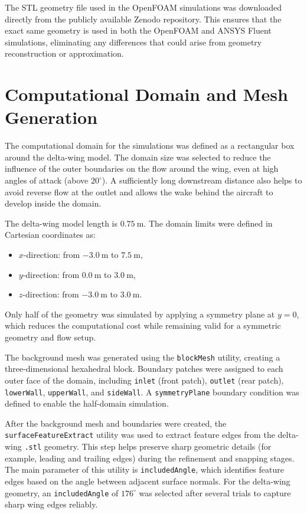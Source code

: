 The STL geometry file used in the OpenFOAM simulations was downloaded directly from the publicly available Zenodo repository. This ensures that the exact same geometry is used in both the OpenFOAM and ANSYS Fluent simulations, eliminating any differences that could arise from geometry reconstruction or approximation.

\section{Computational Domain and Mesh Generation}
The computational domain for the simulations was defined as a rectangular box around the delta-wing model. The domain size was selected to reduce the influence of the outer boundaries on the flow around the wing, even at high angles of attack (above $20^\circ$). A sufficiently long downstream distance also helps to avoid reverse flow at the outlet and allows the wake behind the aircraft to develop inside the domain.

The delta-wing model length is $0.75~\mathrm{m}$. The domain limits were defined in Cartesian coordinates as:
\begin{itemize}
    \item $x$-direction: from $-3.0~\mathrm{m}$ to $7.5~\mathrm{m}$,
    \item $y$-direction: from $0.0~\mathrm{m}$ to $3.0~\mathrm{m}$,
    \item $z$-direction: from $-3.0~\mathrm{m}$ to $3.0~\mathrm{m}$.
\end{itemize}
Only half of the geometry was simulated by applying a symmetry plane at $y = 0$, which reduces the computational cost while remaining valid for a symmetric geometry and flow setup.

The background mesh was generated using the \texttt{blockMesh} utility, creating a three-dimensional hexahedral block. Boundary patches were assigned to each outer face of the domain, including \texttt{inlet} (front patch), \texttt{outlet} (rear patch), \texttt{lowerWall}, \texttt{upperWall}, and \texttt{sideWall}. A \texttt{symmetryPlane} boundary condition was defined to enable the half-domain simulation.

After the background mesh and boundaries were created, the \texttt{surfaceFeatureExtract} utility was used to extract feature edges from the delta-wing \texttt{.stl} geometry. This step helps preserve sharp geometric details (for example, leading and trailing edges) during the refinement and snapping stages. The main parameter of this utility is \texttt{includedAngle}, which identifies feature edges based on the angle between adjacent surface normals. For the delta-wing geometry, an \texttt{includedAngle} of $176^\circ$ was selected after several trials to capture sharp wing edges reliably.

